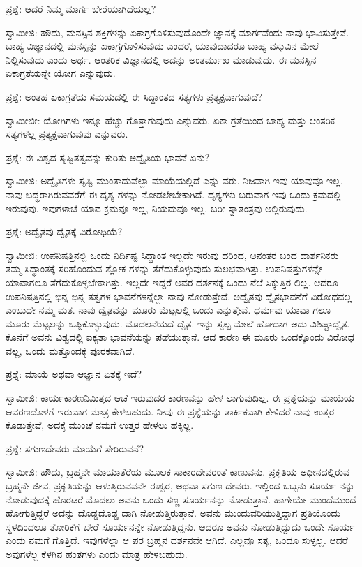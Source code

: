 ಪ್ರಶ್ನೆ: ಆದರೆ ನಿಮ್ಮ ಮಾರ್ಗ ಬೇರೆಯಾಗಿದೆಯಲ್ಲ?

ಸ್ವಾಮೀಜಿ: ಹೌದು, ಮನಸ್ಸಿನ ಶಕ್ತಿಗಳನ್ನು ಏಕಾಗ್ರಗೊಳಿಸುವುದೊಂದೇ ಜ್ಞಾನಕ್ಕೆ ಮಾರ್ಗವೆಂದು ನಾವು ಭಾವಿಸುತ್ತೇವೆ. ಬಾಹ್ಯ ವಿಜ್ಞಾನದಲ್ಲಿ ಮನಸ್ಸನ್ನು ಏಕಾಗ್ರಗೊಳಿಸುವುದು ಎಂದರೆ, ಯಾವುದಾದರೂ ಬಾಹ್ಯ ವಸ್ತುವಿನ ಮೇಲೆ ನಿಲ್ಲಿಸುವುದು ಎಂದು ಅರ್ಥ. ಆಂತರಿಕ ವಿಜ್ಞಾನದಲ್ಲಿ ಅದನ್ನು ಅಂತರ್ಮುಖ ಮಾಡುವುದು. ಈ ಮನಸ್ಸಿನ ಏಕಾಗ್ರತೆಯನ್ನೇ ಯೋಗ ಎನ್ನುವುದು.

ಪ್ರಶ್ನೆ: ಅಂತಹ ಏಕಾಗ್ರತೆಯ ಸಮಯದಲ್ಲಿ ಈ ಸಿದ್ಧಾಂತದ ಸತ್ಯಗಳು ಪ್ರತ್ಯಕ್ಷವಾಗುವುದೆ?

ಸ್ವಾಮೀಜೀ: ಯೋಗಿಗಳು ಇನ್ನೂ ಹೆಚ್ಚು ಗೊತ್ತಾಗುವುದು ಎನ್ನುವರು. ಏಕಾ ಗ್ರತೆಯಿಂದ ಬಾಹ್ಯ ಮತ್ತು ಆಂತರಿಕ ಸತ್ಯಗಳೆಲ್ಲ ಪ್ರತ್ಯಕ್ಷವಾಗುವುವು ಎನ್ನುವರು.

ಪ್ರಶ್ನೆ: ಈ ವಿಶ್ವದ ಸೃಷ್ಟಿತತ್ವವನ್ನು ಕುರಿತು ಅದ್ವೈತಿಯ ಭಾವನೆ ಏನು?

ಸ್ವಾಮೀಜಿ: ಅದ್ವೈತಿಗಳು ಸೃಷ್ಟಿ ಮುಂತಾದುವೆಲ್ಲಾ ಮಾಯೆಯಲ್ಲಿದೆ ಎನ್ನು ವರು. ನಿಜವಾಗಿ ಇವು ಯಾವುವೂ ಇಲ್ಲ. ನಾವು ಬದ್ಧರಾಗಿರುವವರೆಗೆ ಈ ದೃಶ್ಯ ಗಳನ್ನು ನೋಡಲೇಬೇಕಾಗಿದೆ. ದೃಶ್ಯಗಳು ಬರುವಾಗ ಇವು ಒಂದು ಕ್ರಮದಲ್ಲಿ ಇರುವುವು. ಇವುಗಳಾಚೆ ಯಾವ ಕ್ರಮವೂ ಇಲ್ಲ, ನಿಯಮವೂ ಇಲ್ಲ. ಬರೀ ಸ್ವಾತಂತ್ರವು ಅಲ್ಲಿರುವುದು.

ಪ್ರಶ್ನೆ: ಅದ್ವೈತವು ದ್ವೈತಕ್ಕೆ ವಿರೋಧಿಯೆ?

ಸ್ವಾಮೀಜಿ: ಉಪನಿಷತ್ತಿನಲ್ಲಿ ಒಂದು ನಿರ್ದಿಷ್ಟ ಸಿದ್ಧಾಂತ ಇಲ್ಲದೇ ಇರುವು ದರಿಂದ, ಅನಂತರ ಬಂದ ದಾರ್ಶನಿಕರು ತಮ್ಮ ಸಿದ್ಧಾಂತಕ್ಕೆ ಸರಿಹೊಂದುವ ಶ್ಲೋಕ ಗಳನ್ನು ತೆಗೆದುಕೊಳ್ಳುವುದು ಸುಲಭವಾಗಿತ್ತು. ಉಪನಿಷತ್ತುಗಳನ್ನೇ ಯಾವಾಗಲೂ ತೆಗೆದುಕೊಳ್ಳಬೇಕಾಗಿತ್ತು. ಇಲ್ಲದೇ ಇದ್ದರೆ ಅವರ ದರ್ಶನಕ್ಕೆ ಒಂದು ನೆಲೆ ಸಿಕ್ಕುತ್ತಿರ ಲಿಲ್ಲ. ಆದರೂ ಉಪನಿಷತ್ತಿನಲ್ಲಿ ಭಿನ್ನ ಭಿನ್ನ ತತ್ವಗಳ ಭಾವನೆಗಳನ್ನೆಲ್ಲಾ ನಾವು ನೋಡುತ್ತೇವೆ. ಅದ್ವೈತವು ದ್ವೈತಭಾವನೆಗೆ ವಿರೋಧವಲ್ಲ ಎಂಬುದೇ ನಮ್ಮ ಮತ. ನಾವು ದ್ವೈತವನ್ನು ಮೂರು ಮೆಟ್ಟಲಲ್ಲಿ ಒಂದು ಎನ್ನುತ್ತೇವೆ. ಧರ್ಮವು ಯಾವಾ ಗಲೂ ಮೂರು ಮೆಟ್ಟಲನ್ನು ಒಪ್ಪಿಕೊಳ್ಳುವುದು. ಮೊದಲನೆಯದೆ ದ್ವೈತ. ಇನ್ನು ಸ್ವಲ್ಪ ಮೇಲೆ ಹೋದಾಗ ಅದು ವಿಶಿಷ್ಟಾದ್ವೈತ. ಕೊನೆಗೆ ಅವನು ವಿಶ್ವದಲ್ಲಿ ಐಕ್ಯತಾ ಭಾವನೆಯನ್ನು ಪಡೆಯುತ್ತಾನೆ. ಆದ ಕಾರಣ ಈ ಮೂರು ಒಂದಕ್ಕೊಂದು ವಿರೋಧ ವಲ್ಲ, ಒಂದು ಮತ್ತೊಂದಕ್ಕೆ ಪೂರಕವಾಗಿದೆ.

ಪ್ರಶ್ನೆ: ಮಾಯೆ ಅಥವಾ ಆಜ್ಞಾನ ಏತಕ್ಕೆ ಇದೆ?

ಸ್ವಾಮೀಜಿ: ಕಾರ್ಯಕಾರಣನಿಮಿತ್ತದ ಆಚೆ ಇರುವುದರ ಕಾರಣವನ್ನು ಹೇಳ ಲಾಗುವುದಿಲ್ಲ. ಈ ಪ್ರಶ್ನೆಯನ್ನು ಮಾಯೆಯ ಆವರಣದೊಳಗೆ ಇರುವಾಗ ಮಾತ್ರ ಕೇಳಬಹುದು. ನೀವು ಈ ಪ್ರಶ್ನೆಯನ್ನು ತಾರ್ಕಿಕವಾಗಿ ಕೇಳಿದರೆ ನಾವು ಉತ್ತರ ಕೊಡುತ್ತೇವೆ, ಅದಕ್ಕೆ ಮುಂಚೆ ನಮಗೆ ಉತ್ತರ ಹೇಳಲು ಹಕ್ಕಿಲ್ಲ.

ಪ್ರಶ್ನೆ: ಸಗುಣದೇವರು ಮಾಯೆಗೆ ಸೇರಿರುವನೆ?

ಸ್ವಾಮೀಜಿ: ಹೌದು, ಬ್ರಹ್ಮನೇ ಮಾಯಾತೆರೆಯ ಮೂಲಕ ಸಾಕಾರದೇವರಂತೆ ಕಾಣುವನು. ಪ್ರಕೃತಿಯ ಅಧೀನದಲ್ಲಿರುವ ಬ್ರಹ್ಮನೇ ಜೀವ, ಪ್ರಕೃತಿಯನ್ನು ಆಳುತ್ತಿರುವವನೇ ಈಶ್ವರ, ಅಥವಾ ಸಗುಣ ದೇವರು. ಇಲ್ಲಿಂದ ಒಬ್ಬನು ಸೂರ್ಯ ನನ್ನು ನೋಡುವುದಕ್ಕೆ ಹೊರಟರೆ ಮೊದಲು ಅವನು ಒಂದು ಸಣ್ಣ ಸೂರ್ಯನನ್ನು ನೋಡುತ್ತಾನೆ. ಹಾಗೇಯೇ ಮುಂದೆಮುಂದೆ ಹೋಗುತ್ತಿದ್ದರೆ ಅದನ್ನು ದೊಡ್ಡದೊಡ್ಡ ದಾಗಿ ನೋಡುತ್ತಿರುತ್ತಾನೆ. ಅವನು ಮುಂದುವರಿಯುತ್ತಿದ್ದಾಗ ಪ್ರತಿಯೊಂದು ಸ್ಥಳದಿಂದಲೂ ತೋರಿಕೆಗೆ ಬೇರೆ ಸೂರ್ಯನನ್ನೇ ನೋಡುತ್ತಿದ್ದನು. ಆದರೂ ಅವನು ನೋಡುತ್ತಿದ್ದುದು ಒಂದೇ ಸೂರ್ಯ ಎಂದು ನಮಗೆ ಗೊತ್ತಿದೆ. ಇವುಗಳೆಲ್ಲಾ ಆ ಪರ ಬ್ರಹ್ಮನ ದರ್ಶನವೇ ಆಗಿದೆ. ಎಲ್ಲವೂ ಸತ್ಯ, ಒಂದೂ ಸುಳ್ಳಲ್ಲ. ಆದರೆ ಅವುಗಳೆಲ್ಲ ಕೆಳಗಿನ ಹಂತಗಳು ಎಂದು ಮಾತ್ರ ಹೇಳಬಹುದು.

